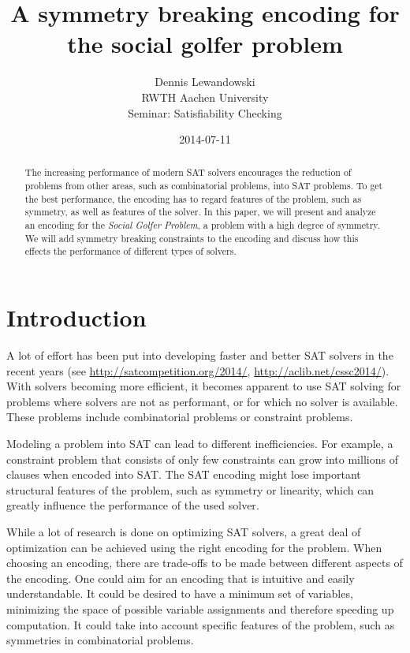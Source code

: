 \documentclass[a4paper]{scrartcl}
\title{A symmetry breaking encoding for the social golfer problem}
\author{Dennis Lewandowski \\
    RWTH Aachen University \\
    Seminar: Satisfiability Checking
    }
\date{2014-07-11}
\begin{document}
\maketitle

\begin{abstract}

The increasing performance of modern SAT solvers encourages the reduction of problems from other areas, such as combinatorial problems, into SAT problems. To get the best performance, the encoding has to regard features of the problem, such as symmetry, as well as features of the solver. In this paper, we will present and analyze an encoding for the \emph{Social Golfer Problem}, a problem with a high degree of symmetry. We will add symmetry breaking constraints to the encoding and discuss how this effects the performance of different types of solvers. 

\end{abstract}

\section{Introduction}

A lot of effort has been put into developing faster and better SAT solvers in the recent years (see \url{http://satcompetition.org/2014/}, \url{http://aclib.net/cssc2014/}). With solvers becoming more efficient, it becomes apparent to use SAT solving for problems where solvers are not as performant, or for which no solver is available. These problems include combinatorial problems or constraint problems.

Modeling a problem into SAT can lead to different inefficiencies. For example, a constraint problem that consists of only few constraints can grow into millions of clauses when encoded into SAT. The SAT encoding might lose important structural features of the problem, such as symmetry or linearity, which can greatly influence the performance of the used solver\cite{ramani}.

While a lot of research is done on optimizing SAT solvers, a great deal of optimization can be achieved using the right encoding for the problem. When choosing an encoding, there are trade-offs to be made between different aspects of the encoding. One could aim for an encoding that is intuitive and easily understandable. It could be desired to have a minimum set of variables, minimizing the space of possible variable assignments and therefore speeding up computation. It could take into account specific features of the problem, such as symmetries in combinatorial problems.
\end{document}

